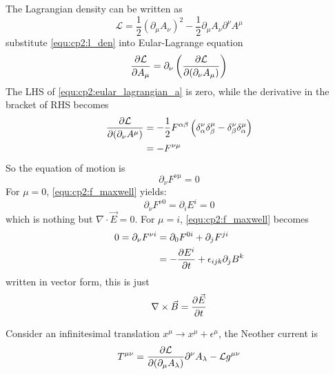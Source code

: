 \solution 
\begin{problembody}
    \item The Lagrangian density can be written as
    \begin{equation}\label{equ:cp2:l_den}
        \mathcal{L} = \frac{1}{2} \left(\partial_\mu A_\nu\right)^2 - \frac{1}{2}\partial_\mu A_\nu \partial^\nu A^\mu
    \end{equation}
    substitute \eqref{equ:cp2:l_den} into Eular-Lagrange equation
    \begin{equation}\label{equ:cp2:eular_lagrangian_a}
        \frac{\partial \mathcal{L}}{\partial A_\mu} = \partial_\nu \left(\frac{\partial \mathcal{L}}{\partial (\partial_\nu A_\mu)}\right)
    \end{equation}
    The LHS of \eqref{equ:cp2:eular_lagrangian_a} is zero, while the derivative in the bracket of RHS becomes
    \begin{align*}
        \frac{\partial \mathcal{L}}{\partial (\partial_\nu A^\mu)} 
        & = -\frac{1}{2} F^{\alpha\beta} \left(\delta^\nu_\alpha \delta^\mu_\beta - \delta^\nu_\beta \delta^\mu_\alpha\right)\\
        & = -F^{\nu\mu}
    \end{align*}
    So the equation of motion is
    \begin{equation}\label{equ:cp2:f_maxwell}
        \partial_\nu F^{\nu\mu} = 0
    \end{equation}
    For $\mu = 0$, \eqref{equ:cp2:f_maxwell} yields:
    \begin{equation*}
        \partial_\nu F^{\nu 0} = \partial_i E^i = 0
    \end{equation*}
    which is nothing but $\nabla\cdot\vec{E} = 0$. For $\mu = i$, \eqref{equ:cp2:f_maxwell} becomes
    \begin{align*}
        0 = \partial_\nu F^{\nu i} 
        & = \partial_0 F^{0i} + \partial_j F^{ji}\\
        & = -\frac{\partial E^i}{\partial t} + \epsilon_{ijk}\partial_j B^k
    \end{align*}
    written in vector form, this is just
    \begin{equation*}
        \nabla\times\vec{B} = \frac{\partial \vec{E}}{\partial t}
    \end{equation*}
    \item Consider an infinitesimal translation $x^\mu \to x^\mu + \epsilon^\mu$, the Neother current 
    is 
    \begin{equation}\label{equ:cp2:a_neother}
        T^{\mu\nu} = \pd{\mathcal{L}}{(\partial_\mu A_\lambda)} \partial^\nu A_\lambda - \mathcal{L} g^{\mu\nu}

\end{equation}
\end{problembody}
